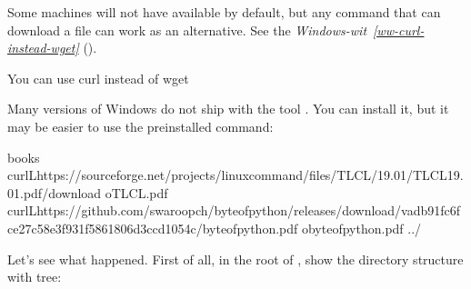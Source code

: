 \sphinxAtStartPar
Some machines will not have  available by default, but any command that can
download a file can work as an alternative. See the \textit{Windows-wit}~{\windowswiticoninline}\textit{\ref{ww-curl-instead-wget}} {\hyperref[\detokenize{basics/101-102-populate:ww-curl-instead-wget}]{}} ().

\ignorespaces \begin{windowswit}[label={ww-curl-instead-wget}, before title={\thetcbcounter\ }, float, floatplacement=tbp, check odd page=true]{You can use curl instead of wget}
\label{\detokenize{basics/101-102-populate:ww-curl-instead-wget}}

\sphinxAtStartPar
Many versions of Windows do not ship with the tool .
You can install it, but it may be easier to use the pre\sphinxhyphen{}installed  command:

\begin{sphinxVerbatim}[commandchars=\\\{\}]
books
curl\PYGZhy{}Lhttps://sourceforge.net/projects/linuxcommand/files/TLCL/19.01/TLCL\PYGZhy{}19.01.pdf/download
\PYGZhy{}oTLCL.pdf
curl\PYGZhy{}Lhttps://github.com/swaroopch/byte\PYGZhy{}of\PYGZhy{}python/releases/download/vadb91fc6fce27c58e3f931f5861806d3ccd1054c/byte\PYGZhy{}of\PYGZhy{}python.pdf
\PYGZhy{}obyte\PYGZhy{}of\PYGZhy{}python.pdf
../
\end{sphinxVerbatim}


\end{windowswit}

\sphinxAtStartPar
Let’s see what happened. First of all, in the root of , show the directory
structure with tree:

